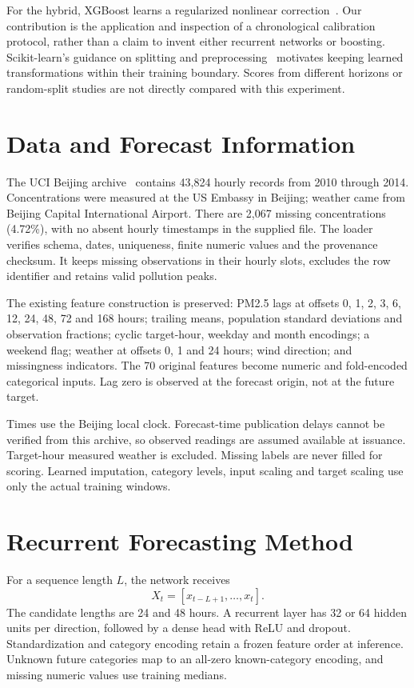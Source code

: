 \documentclass[conference]{IEEEtran}
\begin{document}
For the hybrid, XGBoost learns a regularized nonlinear correction~\cite{xgboost}. Our contribution is the application and inspection of a chronological calibration protocol, rather than a claim to invent either recurrent networks or boosting. Scikit-learn's guidance on splitting and preprocessing~\cite{sklearn} motivates keeping learned transformations within their training boundary. Scores from different horizons or random-split studies are not directly compared with this experiment.

\section{Data and Forecast Information}
The UCI Beijing archive~\cite{uci} contains 43,824 hourly records from 2010 through 2014. Concentrations were measured at the US Embassy in Beijing; weather came from Beijing Capital International Airport. There are 2,067 missing concentrations (4.72\%), with no absent hourly timestamps in the supplied file. The loader verifies schema, dates, uniqueness, finite numeric values and the provenance checksum. It keeps missing observations in their hourly slots, excludes the row identifier and retains valid pollution peaks.

The existing feature construction is preserved: PM2.5 lags at offsets 0, 1, 2, 3, 6, 12, 24, 48, 72 and 168 hours; trailing means, population standard deviations and observation fractions; cyclic target-hour, weekday and month encodings; a weekend flag; weather at offsets 0, 1 and 24 hours; wind direction; and missingness indicators. The 70 original features become numeric and fold-encoded categorical inputs. Lag zero is observed at the forecast origin, not at the future target.

Times use the Beijing local clock. Forecast-time publication delays cannot be verified from this archive, so observed readings are assumed available at issuance. Target-hour measured weather is excluded. Missing labels are never filled for scoring. Learned imputation, category levels, input scaling and target scaling use only the actual training windows.

\section{Recurrent Forecasting Method}
For a sequence length $L$, the network receives
\begin{equation}
X_t=[x_{t-L+1},\ldots,x_t].
\end{equation}
The candidate lengths are 24 and 48 hours. A recurrent layer has 32 or 64 hidden units per direction, followed by a dense head with ReLU and dropout. Standardization and category encoding retain a frozen feature order at inference. Unknown future categories map to an all-zero known-category encoding, and missing numeric values use training medians.
\end{document}
